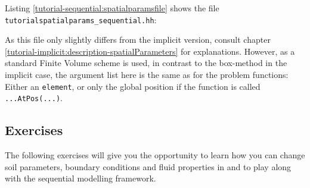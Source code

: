 Listing \ref{tutorial-sequential:spatialparamsfile} shows the file
\verb+tutorialspatialparams_sequential.hh+:

\begin{lst}\label{tutorial-sequential:spatialparamsfile} \mbox{}

\end{lst}
As this file only slightly differs from the implicit version, consult
chapter \ref{tutorial-implicit:description-spatialParameters} for explanations.
However, as a standard Finite Volume scheme is used, in contrast to the box-method
in the implicit case, the argument list here is the same as for the problem
functions: Either an \texttt{element}, or only the global position if the function is called \texttt{...AtPos(...)}.

\subsection{Exercises}
\label{tutorial-deoucpled:exercises}
The following exercises will give you the opportunity to learn how you can change
soil parameters, boundary conditions and fluid properties in \Dumux and to play along
with the sequential modelling framework.

